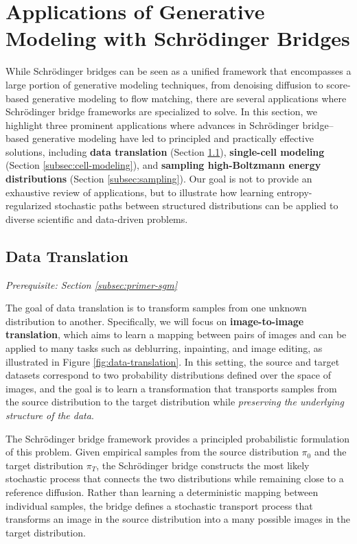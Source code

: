 \documentclass{article}
\newcommand{\boldtext}[1]{\textbf{\textcolor{MyGreen}{#1}}}
\begin{document}
\section{Applications of Generative Modeling with Schrödinger Bridges}
\label{sec:applications}
While Schrödinger bridges can be seen as a unified framework that encompasses a large portion of generative modeling techniques, from denoising diffusion to score-based generative modeling to flow matching, there are several applications where Schrödinger bridge frameworks are specialized to solve. In this section, we highlight three prominent applications where advances in Schrödinger bridge–based generative modeling have led to principled and practically effective solutions, including \textbf{data translation} (Section \ref{subsec:data-translation}), \textbf{single-cell modeling} (Section \ref{subsec:cell-modeling}), and \textbf{sampling high-Boltzmann energy distributions} (Section \ref{subsec:sampling}). Our goal is not to provide an exhaustive review of applications, but to illustrate how learning entropy-regularized stochastic paths between structured distributions can be applied to diverse scientific and data-driven problems. 

\subsection{Data Translation}
\label{subsec:data-translation}

\textit{Prerequisite: Section \ref{subsec:primer-sgm}}

The goal of data translation is to transform samples from one unknown distribution to another. Specifically, we will focus on \boldtext{image-to-image translation}, which aims to learn a mapping between pairs of images and can be applied to many tasks such as deblurring, inpainting, and image editing, as illustrated in Figure \ref{fig:data-translation}. In this setting, the source and target datasets correspond to two probability distributions defined over the space of images, and the goal is to learn a transformation that transports samples from the source distribution to the target distribution while \textit{preserving the underlying structure of the data}.

The Schrödinger bridge framework provides a principled probabilistic formulation of this problem. Given empirical samples from the source distribution $\pi_0$ and the target distribution $\pi_T$, the Schrödinger bridge constructs the most likely stochastic process that connects the two distributions while remaining close to a reference diffusion. Rather than learning a deterministic mapping between individual samples, the bridge defines a stochastic transport process that transforms an image in the source distribution into a many possible images in the target distribution.
\end{document}
